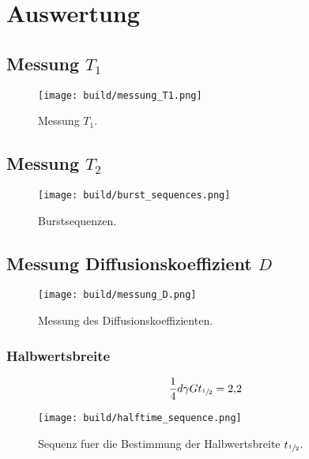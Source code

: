 \section{Auswertung}%
\label{sec:auswertung}

\subsection{Messung $T_1$}%
\label{sub:messung_t_1_}

\begin{figure}[ht]
  \centering
  \texttt{[image: build/messung\_T1.png]}
  \caption{Messung $T_1$.}%
  \label{fig:messung_T1}
\end{figure}

\subsection{Messung $T_2$}%
\label{sub:messung_t_2_}

\begin{figure}[ht]
  \centering
  \texttt{[image: build/burst\_sequences.png]}
  \caption{Burstsequenzen.}%
  \label{fig:burst_sequences}
\end{figure}

\subsection{Messung Diffusionskoeffizient $D$}%
\label{sub:messung_diffusionskoeffizient_d_}

\begin{figure}[ht]
  \centering
  \texttt{[image: build/messung\_D.png]}
  \caption{Messung des Diffusionskoeffizienten.}%
  \label{fig:messung_D}
\end{figure}

\subsubsection{Halbwertsbreite}%
\label{sub:halbwertsbreite}

\begin{align}
  \label{eq:halbwertszeit}
  \frac{1}{4} d \gamma G t_{\sfrac{1}{2}} = \num{2.2}
\end{align}

\begin{figure}[ht]
  \centering
  \texttt{[image: build/halftime\_sequence.png]}
  \caption{Sequenz fuer die Bestimmung der Halbwertsbreite $t_{\sfrac{1}{2}}$.}%
  \label{fig:build/halftime_sequence}
\end{figure}


